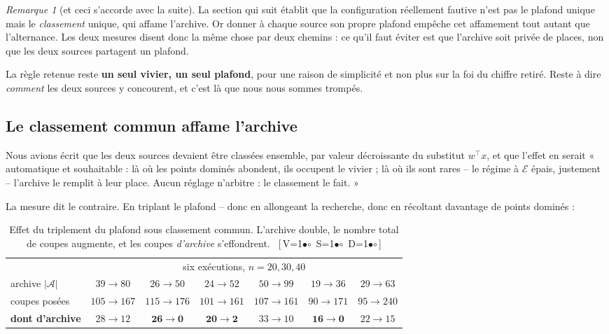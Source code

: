 \documentclass[11pt,a4paper]{article}
\theoremstyle{plain}
\theoremstyle{remark}
\newtheorem{remark}{Remarque}
\newcommand{\Ecal}{\mathcal{E}}
\newcommand{\Acal}{\mathcal{A}}
\newcommand{\cfgm}[1]{\ifnum#1=1$\bullet$\else$\circ$\fi}
\newcommand{\conf}[3]{%
  \textsf{\footnotesize[\,V\cfgm{#1}\ S\cfgm{#2}\ D\cfgm{#3}\,]}}
\begin{document}
\begin{remark}[et ceci s'accorde avec la suite]
La section qui suit établit que la configuration réellement fautive n'est
pas le plafond unique mais le \emph{classement} unique, qui affame
l'archive. Or donner à chaque source son propre plafond empêche cet
affamement tout autant que l'alternance. Les deux mesures disent donc la
même chose par deux chemins : ce qu'il faut éviter est que l'archive soit
privée de places, non que les deux sources partagent un plafond.
\end{remark}

\medskip\noindent
La règle retenue reste \textbf{un seul vivier, un seul plafond}, pour une
raison de simplicité et non plus sur la foi du chiffre retiré. Reste à dire
\emph{comment} les deux sources y concourent, et c'est là que nous nous
sommes trompés.

\subsection{Le classement commun affame l'archive}

Nous avions écrit que les deux sources devaient être classées ensemble, par
valeur décroissante du substitut $w^{\top}x$, et que l'effet en serait
« automatique et souhaitable : là où les points dominés abondent, ils
occupent le vivier ; là où ils sont rares -- le régime à $\Ecal$ épais,
justement -- l'archive le remplit à leur place. Aucun réglage n'arbitre :
le classement le fait. »

La mesure dit le contraire. En triplant le plafond -- donc en allongeant la
recherche, donc en récoltant davantage de points dominés :

\begin{table}[H]
\centering
\caption{Effet du triplement du plafond sous classement commun. L'archive
double, le nombre total de coupes augmente, et les coupes \emph{d'archive}
s'effondrent.\ \conf{0}{1}{0}}
\label{tab:famine}
\begin{tabular}{lcccccc}
\toprule
& \multicolumn{6}{c}{six exécutions, $n=20,30,40$}\\
\cmidrule(l){2-7}
archive $|\Acal|$        & $39\!\to\!80$ & $26\!\to\!50$ & $24\!\to\!52$
                         & $50\!\to\!99$ & $19\!\to\!36$ & $29\!\to\!63$\\
coupes posées            & $105\!\to\!167$ & $115\!\to\!176$ & $101\!\to\!161$
                         & $107\!\to\!161$ & $90\!\to\!171$ & $95\!\to\!240$\\
\textbf{dont d'archive}  & $28\!\to\!12$ & $\mathbf{26\!\to\!0}$
                         & $\mathbf{20\!\to\!2}$ & $33\!\to\!10$
                         & $\mathbf{16\!\to\!0}$ & $22\!\to\!15$\\
\bottomrule
\end{tabular}
\end{table}
\end{document}
